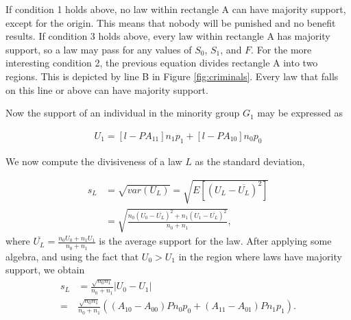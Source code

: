 If condition 1 holds above, no law within rectangle A can have majority support, except for the origin.  This means that nobody will be punished and no benefit results.  If condition 3 holds above, every law within rectangle A has majority support, so a law may pass for any values of $S_0$, $S_1$, and $F$.  For the more interesting condition 2, the previous equation divides rectangle A into two regions.  This is depicted by line B in Figure \ref{fig:criminals}.  Every law that falls on this line or above can have majority support.

Now the support of an individual in the minority group $G_1$ may be expressed as %

\begin{align}
U_1 =  [ l  -  P A_{11} ]n_1 p_1  + [l - P A_{10}] n_0 p_0  
\end{align}


We now compute the divisiveness of a law $L$ as the standard deviation,

\begin{align}
\nonumber s_L &= \sqrt{var(U_L)}  =  \sqrt{E\left[ \left(U_L - \overline{U_L} \right)^2 \right] }  \\
\nonumber &= \sqrt{ \frac{ n_0\left(U_0 - \overline{U_L}\right)^2 + n_1\left(U_1 - \overline{U_L} \right)^2 }{n_0+n_1}  },
\end{align}
where $\overline{U_L} = \frac{n_0 U_0 + n_1U_1 }{n_0 + n_1}$ is the average support for the law.  After applying some algebra, and using the fact that $U_0>U_1$ in the region where laws have majority support, we obtain 
\begin{align}
\nonumber s_L &= \frac{\sqrt{n_0n_1}}{n_0 + n_1} \left| U_0 - U_1 \right|\\
\nonumber = &\frac{\sqrt{n_0n_1}}{n_0 + n_1} \left(  ( A_{10} - A_{00} )P n_0p_0 + ( A_{11} - A_{01})P n_1p_1 \right).
\end{align}

